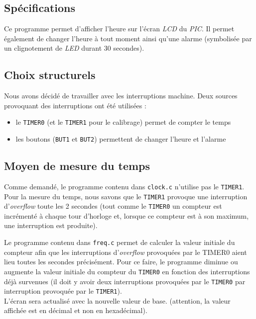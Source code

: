 \subsection{Spécifications}

Ce programme permet d'afficher l'heure sur l'écran \textit{LCD} du \textit{PIC}. Il permet également de changer l'heure à tout moment ainsi qu'une alarme (symbolisée par un clignotement de \textit{LED} durant 30 secondes).

\subsection{Choix structurels}\label{choix}

Nous avons décidé de travailler avec les interruptions machine. Deux sources provoquant des interruptions ont été utilisées :
\begin{itemize}
	\item le \texttt{TIMER0} (et le \texttt{TIMER1} pour le calibrage) permet de compter le temps
	\item les boutons (\texttt{BUT1} et \texttt{BUT2}) permettent de changer l'heure et l'alarme 
\end{itemize}

\subsection{Moyen de mesure du temps}

Comme demandé, le programme contenu dans \texttt{clock.c} n'utilise pas le \texttt{TIMER1}. Pour la mesure du temps, nous savons que le \texttt{TIMER1} provoque une interruption d'\textit{overflow} toute les 2 secondes (tout comme le \texttt{TIMER0} un compteur est incrémenté à chaque tour d'horloge et, lorsque ce compteur est à son maximum, une interruption est produite).

Le programme contenu dans \texttt{freq.c} permet de calculer la valeur initiale du compteur afin que les interruptions d'\textit{overflow} provoquées par le TIMER0 aient lieu toutes les secondes précisément. Pour ce faire, le programme diminue ou augmente la valeur initiale du compteur du \texttt{TIMER0} en fonction des interruptions déjà survenues (il doit y avoir deux interruptions provoquées par le \texttt{TIMER0} par interruption provoquée par le \texttt{TIMER1}).\\
L'écran sera actualisé avec la nouvelle valeur de base. (attention, la valeur affichée est en décimal et non en hexadécimal).

